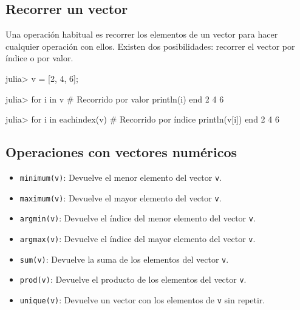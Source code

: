 \documentclass[
  letterpaper,
  DIV=11,
  numbers=noendperiod]{scrreprt}
\newenvironment{Shaded}{\begin{snugshade}}{\end{snugshade}}
\newcommand{\CommentTok}[1]{\textcolor[rgb]{0.37,0.37,0.37}{#1}}
\newcommand{\ControlFlowTok}[1]{\textcolor[rgb]{0.00,0.23,0.31}{#1}}
\newcommand{\FloatTok}[1]{\textcolor[rgb]{0.68,0.00,0.00}{#1}}
\newcommand{\FunctionTok}[1]{\textcolor[rgb]{0.28,0.35,0.67}{#1}}
\newcommand{\KeywordTok}[1]{\textcolor[rgb]{0.00,0.23,0.31}{#1}}
\newcommand{\NormalTok}[1]{\textcolor[rgb]{0.00,0.23,0.31}{#1}}
\newcommand{\OperatorTok}[1]{\textcolor[rgb]{0.37,0.37,0.37}{#1}}
\providecommand{\tightlist}{%
  \setlength{\itemsep}{0pt}\setlength{\parskip}{0pt}}\usepackage{longtable,booktabs,array}
\begin{document}
\hypertarget{recorrer-un-vector}{%
\subsection{Recorrer un vector}\label{recorrer-un-vector}}

Una operación habitual es recorrer los elementos de un vector para hacer
cualquier operación con ellos. Existen dos posibilidades: recorrer el
vector por índice o por valor.

\begin{Shaded}
\begin{Highlighting}[]
\NormalTok{julia}\OperatorTok{\textgreater{}}\NormalTok{ v }\OperatorTok{=}\NormalTok{ [}\FloatTok{2}\NormalTok{, }\FloatTok{4}\NormalTok{, }\FloatTok{6}\NormalTok{];}

\NormalTok{julia}\OperatorTok{\textgreater{}} \ControlFlowTok{for}\NormalTok{ i }\KeywordTok{in}\NormalTok{ v  }\CommentTok{\# Recorrido por valor}
         \FunctionTok{println}\NormalTok{(i)}
       \ControlFlowTok{end}
\FloatTok{2}
\FloatTok{4}
\FloatTok{6}

\NormalTok{julia}\OperatorTok{\textgreater{}} \ControlFlowTok{for}\NormalTok{ i }\KeywordTok{in} \FunctionTok{eachindex}\NormalTok{(v)  }\CommentTok{\# Recorrido por índice}
         \FunctionTok{println}\NormalTok{(v[i])}
       \ControlFlowTok{end}
\FloatTok{2}
\FloatTok{4}
\FloatTok{6}
\end{Highlighting}
\end{Shaded}

\hypertarget{operaciones-con-vectores-numuxe9ricos}{%
\subsection{Operaciones con vectores
numéricos}\label{operaciones-con-vectores-numuxe9ricos}}

\begin{itemize}
\tightlist
\item
  \texttt{minimum(v)}: Devuelve el menor elemento del vector \texttt{v}.
\item
  \texttt{maximum(v)}: Devuelve el mayor elemento del vector \texttt{v}.
\item
  \texttt{argmin(v)}: Devuelve el índice del menor elemento del vector
  \texttt{v}.
\item
  \texttt{argmax(v)}: Devuelve el índice del mayor elemento del vector
  \texttt{v}.
\item
  \texttt{sum(v)}: Devuelve la suma de los elementos del vector
  \texttt{v}.
\item
  \texttt{prod(v)}: Devuelve el producto de los elementos del vector
  \texttt{v}.
\item
  \texttt{unique(v)}: Devuelve un vector con los elementos de \texttt{v}
  sin repetir.
\end{itemize}
\end{document}
